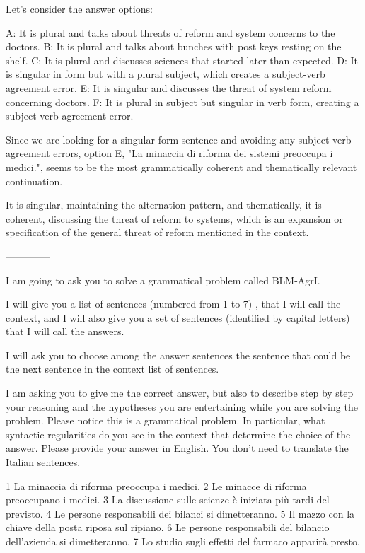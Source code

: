 Let's consider the answer options:

A: It is plural and talks about threats of reform and system concerns to the doctors.
B: It is plural and talks about bunches with post keys resting on the shelf.
C: It is plural and discusses sciences that started later than expected.
D: It is singular in form but with a plural subject, which creates a subject-verb agreement error.
E: It is singular and discusses the threat of system reform concerning doctors.
F: It is plural in subject but singular in verb form, creating a subject-verb agreement error.

Since we are looking for a singular form sentence and avoiding any subject-verb agreement errors, option E, "La minaccia di riforma dei sistemi preoccupa i medici.", seems to be the most grammatically coherent and thematically relevant continuation.

It is singular, maintaining the alternation pattern, and thematically, it is coherent, discussing the threat of reform to systems, which is an expansion or specification of the general threat of reform mentioned in the context.

--------------

I am going to ask you to solve a grammatical problem called BLM-AgrI.  

I will give you a list of sentences (numbered from 1 to 7) , that I will call the context, and I will also give you a set of sentences (identified by capital letters) that I will call  the answers. 

I will ask you to choose among the answer sentences the sentence that could be the next sentence in the context list of sentences.

I am asking you to give me the correct answer, but also to describe step by step  your reasoning and the hypotheses you are entertaining while you are solving the problem. Please notice this is a grammatical problem. In particular, what syntactic regularities do you see in the context that determine the choice of the answer.
Please provide your answer in English. You don't need to translate the Italian sentences.


1 La minaccia di riforma preoccupa i medici.
2 Le minacce di riforma preoccupano i medici.
3 La discussione sulle scienze è iniziata più tardi del previsto.
4 Le persone responsabili dei bilanci si dimetteranno.
5 Il mazzo con la chiave della posta riposa sul ripiano.
6 Le persone responsabili del bilancio dell'azienda si dimetteranno.
7 Lo studio sugli effetti del farmaco apparirà presto.

